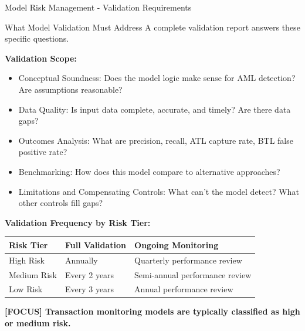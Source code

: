 \documentclass[11pt,a4paper]{beamer}
\newcommand{\examfocus}[1]{\textcolor{orange!80!black}{\textbf{[FOCUS] #1}}}
\begin{document}
	\begin{frame}{Model Risk Management - Validation Requirements}
		\begin{block}{What Model Validation Must Address}
			A complete validation report answers these specific questions.
		\end{block}
		
		\textbf{Validation Scope:}
		\begin{itemize}
			\item Conceptual Soundness: Does the model logic make sense for AML detection? Are assumptions reasonable?
			\item Data Quality: Is input data complete, accurate, and timely? Are there data gaps?
			\item Outcomes Analysis: What are precision, recall, ATL capture rate, BTL false positive rate?
			\item Benchmarking: How does this model compare to alternative approaches?
			\item Limitations and Compensating Controls: What can't the model detect? What other controls fill gaps?
		\end{itemize}
		
		\textbf{Validation Frequency by Risk Tier:}
		\begin{longtable}{p{}|p{}|p{}}
			\hline
			\rowcolor{lightgray}
			\textbf{Risk Tier} & \textbf{Full Validation} & \textbf{Ongoing Monitoring} \\
			\hline
			High Risk & Annually & Quarterly performance review \\
			\hline
			Medium Risk & Every 2 years & Semi-annual performance review \\
			\hline
			Low Risk & Every 3 years & Annual performance review \\
			\hline
		\end{longtable}
		
		\examfocus{Transaction monitoring models are typically classified as high or medium risk.}
	\end{frame}
	
\end{document}
